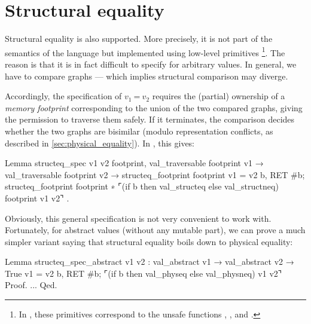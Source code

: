 \section{Structural equality}
\label{sec:structural_equality}

Structural equality is also supported.
More precisely, it is not part of the semantics of the language but implemented using low-level primitives%
\footnote{
In \OCaml, these primitives correspond to the unsafe functions , ,  and .
}.
The reason is that it is in fact difficult to specify for arbitrary values.
In general, we have to compare graphs --- which implies structural comparison may diverge.

Accordingly, the specification of $v_1\ \texttt{=}\ v_2$ requires the (partial) ownership of a \emph{memory footprint} corresponding to the union of the two compared graphs, giving the permission to traverse them safely.
If it terminates, the comparison decides whether the two graphs are bisimilar (modulo representation conflicts, as described in \cref{sec:physical_equality}).
In \Iris, this gives:

\begin{coqcode}
Lemma structeq_spec v1 v2 footprint,
  val_traversable footprint v1 →
  val_traversable footprint v2 →
  {{{ structeq_footprint footprint }}}
    v1 = v2
  {{{ b, RET #b;
      structeq_footprint footprint ∗
      ⌜(if b then val_structeq else val_structneq) footprint v1 v2⌝ }}}.
\end{coqcode}

Obviously, this general specification is not very convenient to work with.
Fortunately, for abstract values (without any mutable part), we can prove a much simpler variant saying that structural equality boils down to physical equality:

\begin{coqcode}
Lemma structeq_spec_abstract v1 v2 :
  val_abstract v1 →
  val_abstract v2 →
  {{{ True }}}
    v1 = v2
  {{{ b, RET #b; ⌜(if b then val_physeq else val_physneq) v1 v2⌝ }}}
Proof. ... Qed.
\end{coqcode}


